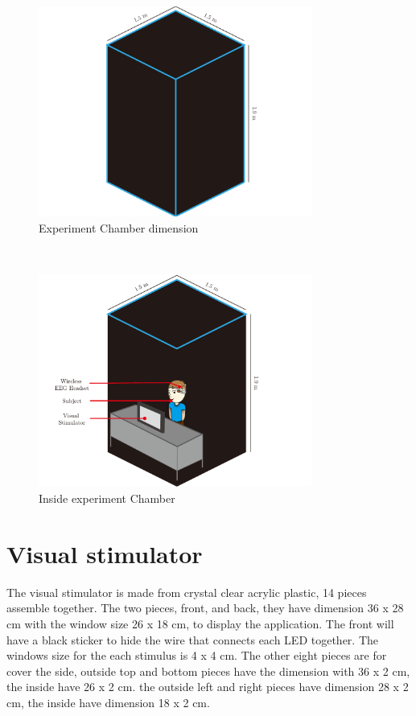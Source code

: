 \begin{figure}[ht]
	\centering
	\includegraphics[width=0.8\textwidth]{chapter6/dark_wire.pdf}
	\caption{Experiment Chamber dimension}
\end{figure}
\\
\begin{figure}[ht]
	\centering
	\includegraphics[width=0.8\textwidth]{chapter6/dark_wire_inside.pdf}
	\caption{Inside experiment Chamber}
\end{figure}

\section{Visual stimulator}

\hspace{1.5cm}The visual stimulator is made from crystal clear acrylic plastic, 14 pieces assemble together. The two pieces, front, and back, they have dimension 36 x 28 cm with the window size 26 x 18 cm, to display the application. The front will have a black sticker to hide the wire that connects each LED together. The windows size for the each stimulus is 4 x 4 cm. The other eight pieces are for cover the side, outside top and bottom pieces have the dimension with 36 x 2 cm, the inside have 26 x 2 cm. the outside left and right pieces have dimension 28 x 2 cm, the inside have dimension 18 x 2  cm.\\

